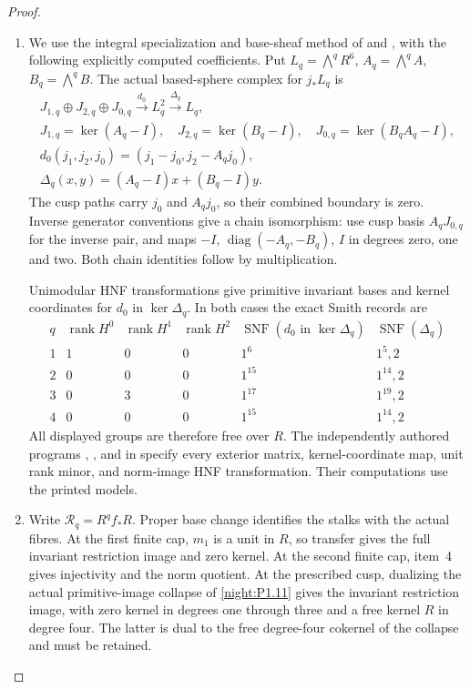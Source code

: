 \documentclass[11pt,a4paper]{article}
\theoremstyle{definition}
\begin{document}
\begin{proof}
\begin{enumerate}[label=\arabic*.]
\item We use the integral specialization and base-sheaf method
of \cite[Lemma~7.25 and Propositions~7.26--7.27, pp.~61--63]{AC26}
and \cite[section ``The integral homology'']{E26}, with the
following explicitly computed coefficients.  Put
$L_q=\bigwedge^qR^6$, $A_q=\bigwedge^qA$, $B_q=\bigwedge^qB$.
The actual based-sphere complex for $j_*L_q$ is
\[
\begin{gathered}
 J_{1,q}\oplus J_{2,q}\oplus J_{0,q}
 \xrightarrow{d_0} L_q^2\xrightarrow{\Delta_q}L_q,\\
 J_{1,q}=\ker(A_q-I),\quad J_{2,q}=\ker(B_q-I),\quad
 J_{0,q}=\ker(B_qA_q-I),\\
 d_0(j_1,j_2,j_0)=(j_1-j_0,j_2-A_qj_0),\\
 \Delta_q(x,y)=(A_q-I)x+(B_q-I)y.
\end{gathered}
\]
The cusp paths carry $j_0$ and $A_qj_0$, so their combined
boundary is zero.  Inverse generator conventions give a chain
isomorphism: use cusp basis $A_qJ_{0,q}$ for the inverse pair,
and maps $-I$, $\operatorname{diag}(-A_q,-B_q)$, $I$ in degrees
zero, one and two.  Both chain identities follow by multiplication.

Unimodular HNF transformations give primitive invariant bases
and kernel coordinates for $d_0$ in $\ker\Delta_q$.  In both cases
the exact Smith records are
\[
\begin{array}{c|ccc|c|c}
q&\operatorname{rank}H^0&\operatorname{rank}H^1&\operatorname{rank}H^2
 &\operatorname{SNF}(d_0\text{ in }\ker\Delta_q)
 &\operatorname{SNF}(\Delta_q)\\\hline
1&1&0&0&1^6&1^5,2\\
2&0&0&0&1^{15}&1^{14},2\\
3&0&3&0&1^{17}&1^{19},2\\
4&0&0&0&1^{15}&1^{14},2
\end{array}
\]
All displayed groups are therefore free over $R$.  The independently
authored programs
,
, and 
in  specify every exterior matrix,
kernel-coordinate map, unit rank minor, and norm-image HNF
transformation.  Their computations use the printed models.

\item Write $\mathcal R_q=R^qf_*R$.  Proper base change
\cite[Tag~09V5, Lemma~20.18.1]{StacksProject} identifies the stalks
with the actual fibres.  At the first finite cap, $m_1$ is a
unit in $R$, so transfer gives the full invariant restriction
image and zero kernel.  At the second finite cap, item~4 gives
injectivity and the norm quotient.  At the prescribed cusp,
dualizing the actual primitive-image collapse of
\cref{night:P1.11} gives the invariant restriction image, with
zero kernel in degrees one through three and a free kernel $R$
in degree four.  The latter is dual to the free degree-four
cokernel of the collapse and must be retained.


\end{enumerate}
\end{proof}
\end{document}
